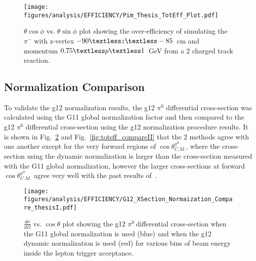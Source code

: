 \documentclass[11pt,a4paper]{article}
\def\pizT{$\pi^{0} \ $}
\def\figures{/Users/michaelkunkel/WORK/GIT_HUB/THESIS/figures/print}
\newlength{\figwidth}
\newlength{\hfigheight}
\begin{document}
											\begin{figure}[h!]\begin{center}
													\texttt{[image: \\figures/analysis/EFFICIENCY/Pim\_Thesis\_TotEff\_Plot.pdf]}
													\caption[$\theta \cos\phi$ vs. $\theta \sin\phi$ plot showing the over-efficiency of simulating the $\pi^-$ with z-vertex $-90\textless z\textless-85$~cm and momentum $0.75\textless p \textless 1$~GeV from a 2 charged track reaction]{\label{fig:toteff_pim} $\theta \cos\phi$ vs. $\theta \sin\phi$ plot showing the over-efficiency of simulating the $\pi^-$ with z-vertex $-90\textless z\textless-85$~cm and momentum $0.75\textless p \textless 1$~GeV from a 2 charged track reaction.}
												\end{center}\end{figure}
												\FloatBarrier
	\subsection{Normalization Comparison}
												To validate the g12 normalization results, the g12 $\pi^0$ differential cross-section was calculated using the G11 global normalization factor and then compared to the g12 $\pi^0$ differential cross-section using the g12 normalization procedure results. It is shown in Fig.~\ref{fig:toteff_compareI} and Fig.~\ref{fig:toteff_compareII} that the 2 methods agree with one another except for the very forward regions of $\cos\theta^{\pi^0}_{C.M.}$, where the cross-section using the dynamic normalization is larger than the cross-section measured with the G11 global normalization, however the larger cross-sections at forward $\cos\theta^{\pi^0}_{C.M.}$ agree very well with the past results of~\cite{ELSA11}.
												
												\begin{figure}[h!]\begin{center}
														\texttt{[image: \\figures/analysis/EFFICIENCY/G12\_XSection\_Normaization\_Compare\_thesisI.pdf]}
														\caption[$\frac{d \sigma}{d \Omega}$ vs. $\cos \theta$ plot showing the g12 \pizT differential cross-section when the G11 global normalization is used (blue) and when the g12 dynamic normalization is used (red) for various bins of beam energy inside lepton trigger acceptance]{\label{fig:toteff_compareI} $\frac{d \sigma}{d \Omega}$ vs. $\cos \theta$ plot showing the g12 \pizT differential cross-section when the G11 global normalization is used (blue) and when the g12 dynamic normalization is used (red) for various bins of beam energy inside the lepton trigger acceptance.}
													\end{center}\end{figure}
													
\end{document}
